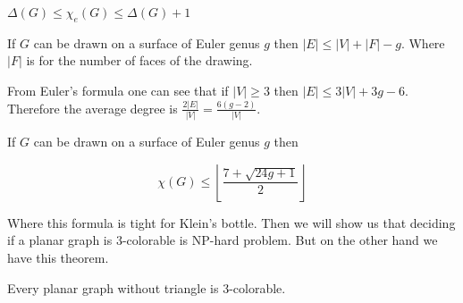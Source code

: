 \begin{thm}[Vizing]
	$\Delta(G) \leq \chi_e(G) \leq \Delta(G) + 1$
\end{thm}

\begin{thm}
	If $G$ can be drawn on a surface of Euler genus $g$ then $|E| \leq |V| + |F| - g$. Where $|F|$ is for the number of faces of the drawing.
\end{thm}

From Euler's formula one can see that if $|V| \geq 3$ then $|E| \leq 3 |V| + 3g - 6$. Therefore the average degree is $\frac{2|E|}{|V|} = \frac{6(g-2)}{|V|}$.

\begin{thm}
	If $G$ can be drawn on a surface of Euler genus $g$ then
	
	$$
	\chi(G) \leq \left \lfloor \frac{7 + \sqrt{24 g + 1}}{2} \right \rfloor
	$$
\end{thm}

Where this formula is tight for Klein's bottle. Then we will show us that deciding if a planar graph is 3-colorable is NP-hard problem. But on the other hand we have this theorem.

\begin{thm}[Grötsch]
	Every planar graph without triangle is 3-colorable.
\end{thm}